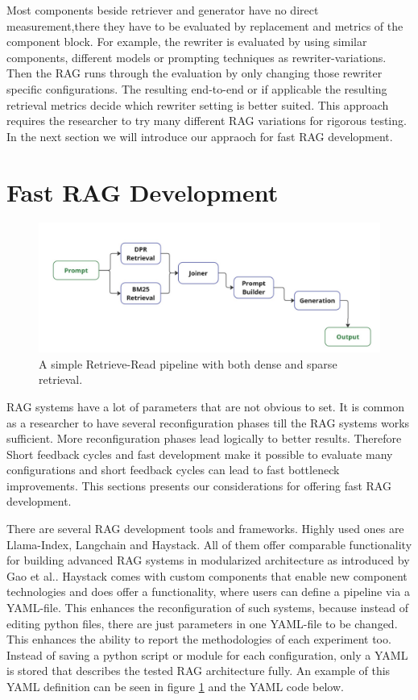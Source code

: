 Most components beside retriever and generator have no direct measurement,there they have to be evaluated by replacement and metrics of the component block. For example, the rewriter is evaluated by using similar components, different models or prompting techniques as rewriter-variations. Then the RAG runs through the evaluation by only changing those rewriter specific configurations. The resulting end-to-end or if applicable the resulting retrieval metrics decide which rewriter setting is better suited. This approach requires the researcher to try many different RAG variations for rigorous testing. In the next section we will introduce our appraoch for fast RAG development.

\section{Fast RAG Development}

\begin{figure}[b]
    \centering
    \includegraphics[width=\textwidth]{images/showcase-pipeline.pdf}
    \caption{A simple Retrieve-Read pipeline with both dense and sparse retrieval.}
    \label{fig:showcase}
\end{figure}

RAG systems have a lot of parameters that are not obvious to set. It is common as a researcher to have several reconfiguration phases till the RAG systems works sufficient. More reconfiguration phases lead logically to better results. Therefore Short feedback cycles and fast development make it possible to evaluate many configurations and short feedback cycles can lead to fast bottleneck improvements. This sections presents our considerations for offering fast RAG development.

There are several RAG development tools and frameworks. Highly used ones are Llama-Index\cite{Liu_LlamaIndex_2022}, Langchain\cite{Chase_LangChain_2022} and Haystack\cite{Pietsch_Haystack_the_end-to-end_2019}. All of them offer comparable functionality for building advanced RAG systems in modularized architecture as introduced by Gao et al.\cite{Gao.18.12.2023}. Haystack comes with custom components that enable new component technologies and does offer a functionality, where users can define a pipeline via a YAML-file. This enhances the reconfiguration of such systems, because instead of editing python files, there are just parameters in one YAML-file to be changed. This enhances the ability to report the methodologies of each experiment too. Instead of saving a python script or module for each configuration, only a YAML is stored that describes the tested RAG architecture fully. An example of this YAML definition can be seen in figure \ref{fig:showcase} and the YAML code below.

